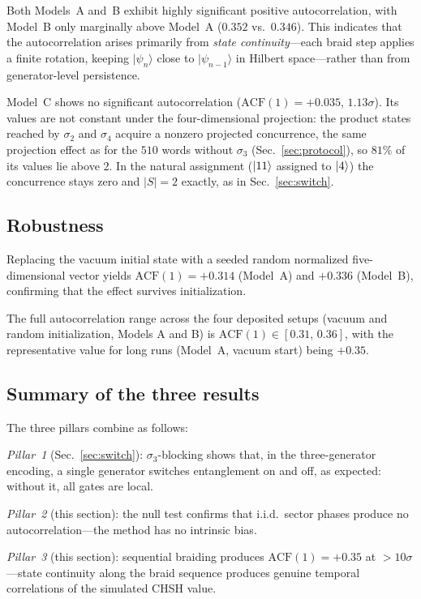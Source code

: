 \documentclass[aps,pra,twocolumn,superscriptaddress,longbibliography,floatfix,nofootinbib]{revtex4-2}
\begin{document}
Both Models~A and~B exhibit highly significant positive autocorrelation,
with Model~B only marginally above Model~A ($0.352$ vs.\ $0.346$).
This indicates that the autocorrelation arises primarily from
\emph{state continuity}---each braid step applies a finite rotation,
keeping $|\psi_n\rangle$ close to $|\psi_{n-1}\rangle$ in Hilbert
space---rather than from generator-level persistence.

Model~C shows no significant autocorrelation ($\text{ACF}(1)=+0.035$,
$1.13\sigma$). Its values are not constant under the four-dimensional
projection: the product states reached by $\sigma_2$ and $\sigma_4$ acquire a
nonzero projected concurrence, the same projection effect as for the $510$
words without $\sigma_3$ (Sec.~\ref{sec:protocol}), so $81\%$ of its values
lie above 2. In the natural assignment ($\ket{11}$ assigned to $\ket{4}$) the
concurrence stays zero and $|S|=2$ exactly, as in Sec.~\ref{sec:switch}.


\subsection{Robustness}

Replacing the vacuum initial state with a seeded random normalized
five-dimensional vector yields $\text{ACF}(1)=+0.314$ (Model~A) and $+0.336$
(Model~B), confirming that the effect survives
initialization.

The full autocorrelation range across the four deposited setups
(vacuum and random initialization, Models A and B) is
$\text{ACF}(1)\in [0.31,\,0.36]$, with the representative value for long runs
(Model~A, vacuum start) being $+0.35$.

\subsection{Summary of the three results}

The three pillars combine as follows:

\emph{Pillar~1} (Sec.~\ref{sec:switch}): $\sigma_3$-blocking shows
that, in the three-generator encoding, a single generator switches
entanglement on and off, as expected: without it, all gates are local.

\emph{Pillar~2} (this section): the null test confirms that
i.i.d.\ sector phases produce no autocorrelation---the method has
no intrinsic bias.

\emph{Pillar~3} (this section): sequential braiding produces
$\text{ACF}(1)=+0.35$ at $>10\sigma$---state continuity along the braid
sequence produces genuine temporal correlations of the simulated CHSH
value.
\end{document}

